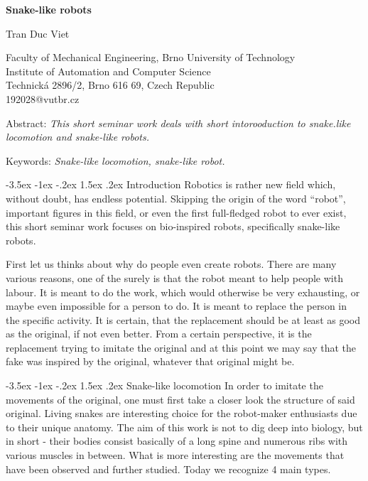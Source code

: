 \documentclass[a4paper,10pt]{article}
\makeatletter
\theoremstyle{definition}
\renewcommand\section{\@startsection {section}{1}{\z@}%
                                   {-3.5ex \@plus -1ex \@minus -.2ex}%
                                   {1.5ex \@plus.2ex}%
                                   {\large\bfseries}}
\makeatother
\begin{document}
\pagestyle{empty}

\begin{center}
{\bf \Large Snake-like robots}
\end{center}

\smallskip
\begin{center}
{\large Tran Duc Viet}
\end{center}

\smallskip
\begin{center}
Faculty of Mechanical Engineering, Brno University of Technology\\
Institute of Automation and Computer Science\\
Technická 2896/2, Brno 616 69, Czech Republic\\
192028@vutbr.cz\\
\end{center}

\bigskip
\noindent Abstract: \textit{This short seminar work deals with short intorooduction to snake.like locomotion and snake-like robots.}

\vspace*{10pt} \noindent Keywords: \textit{Snake-like locomotion, snake-like robot.}

\bigskip
\section{Introduction}
\label{sec:1}
Robotics is rather new field which, without doubt, has endless potential. Skipping the origin of the word “robot”, important figures in this field, or even the first full-fledged robot to ever exist, this short seminar work focuses on bio-inspired robots, specifically snake-like robots.

First let us thinks about why do people even create robots. There are many various reasons, one of the surely is that the robot meant to help people with labour. It is meant to do the work, which would otherwise be very exhausting, or maybe even impossible for a person to do. It is meant to replace the person in the specific activity. It is certain, that the replacement should be at least as good as the original, if not even better. From a certain perspective, it is the replacement trying to imitate the original and at this point we may say that the fake was inspired by the original, whatever that original might be.


\section{Snake-like locomotion}
In order to imitate the movements of the original, one must first take a closer look the structure of said original. Living snakes are interesting choice for the robot-maker enthusiasts due to their unique anatomy. The aim of this work is not to dig deep into biology, but in short - their bodies consist basically of a long spine and numerous ribs with various muscles in between. What is more interesting are the movements that have been observed and further studied. Today we recognize 4 main types.
\end{document}
